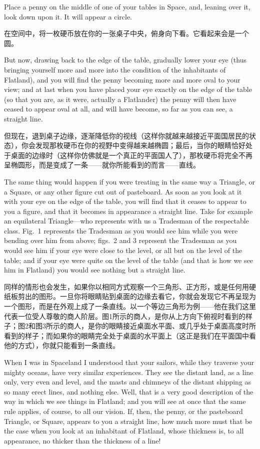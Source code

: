 \documentclass[12pt,UTF8]{ctexbook}
\begin{document}
Place a penny on the middle of one of your tables in Space, and, leaning over it, look down upon it. It will appear a circle.

在空间中，将一枚硬币放在你的一张桌子中央，俯身向下看。它看起来会是一个圆。

But now, drawing back to the edge of the table, gradually lower your eye (thus bringing yourself more and more into the condition of the inhabitants of Flatland), and you will find the penny becoming more and more oval to your view; and at last when you have placed your eye exactly on the edge of the table (so that you are, as it were, actually a Flatlander) the penny will then have ceased to appear oval at all, and will have become, so far as you can see, a straight line.

但现在，退到桌子边缘，逐渐降低你的视线（这样你就越来越接近平面国居民的状态），你会发现那枚硬币在你的视野中变得越来越椭圆；最后，当你的眼睛恰好处于桌面的边缘时（这样你仿佛就是一个真正的平面国人了），那枚硬币将完全不再呈椭圆形，而是变成了一条——就你所能看到的而言——直线。

The same thing would happen if you were treating in the same way a Triangle, or a Square, or any other figure cut out of pasteboard. As soon as you look at it with your eye on the edge of the table, you will find that it ceases to appear to you a figure, and that it becomes in appearance a straight line. Take for example an equilateral Triangle---who represents with us a Tradesman of the respectable class. Fig.\ 1 represents the Tradesman as you would see him while you were bending over him from above; figs.\ 2 and 3 represent the Tradesman as you would see him if your eye were close to the level, or all but on the level of the table; and if your eye were quite on the level of the table (and that is how we see him in Flatland) you would see nothing but a straight line.

同样的情形也会发生，如果你以相同方式观察一个三角形、正方形，或是任何用硬纸板剪出的图形。一旦你将眼睛贴到桌面的边缘去看它，你就会发现它不再呈现为一个图形，而是在外观上成了一条直线。以一个等边三角形为例——他在我们这里代表一位受人尊敬的商人阶层。图1所示的商人，是你从上方向下俯视时看到的样子；图2和图3所示的商人，是你的眼睛接近桌面水平面、或几乎处于桌面高度时所看到的样子；而如果你的眼睛完全处于桌面的水平面上（这正是我们在平面国中看他的方式），你就只能看到一条直线。

When I was in Spaceland I understood that your sailors, while they traverse your mighty oceans, have very similar experiences. They see the distant land, as a line only, very even and level, and the masts and chimneys of the distant shipping as so many erect lines, and nothing else. Well, that is a very good description of the way in which we see things in Flatland; and you will see at once that the same rule applies, of course, to all our vision. If, then, the penny, or the pasteboard Triangle, or Square, appears to you a straight line, how much more must that be the case when you look at an inhabitant of Flatland, whose thickness is, to all appearance, no thicker than the thickness of a line!
\end{document}
